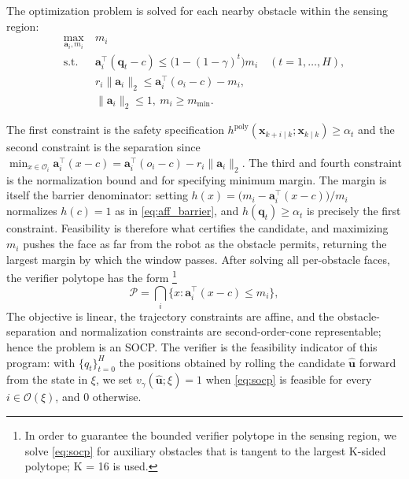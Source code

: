 \documentclass[letterpaper, 10 pt, conference]{ieeeconf}
\newcommand{\q}{\mathbf{q}}
\newcommand{\x}{\mathbf{x}}
\newcommand{\xk}{\mathbf{\x}_{k\mid k}}
\newcommand{\xki}{\mathbf{\x}_{k+i\mid k}}
\newcommand{\ai}{\mathbf{a}_{i}}
\begin{document}
The optimization problem is solved for each nearby obstacle within the sensing region:
\begin{equation}
\begin{aligned}
\max_{\ai, m_i}\ & m_i\\
\text{s.t. }\ & \ai^\top(\mathbf{q}_t-c)\le\big(1-(1-\gamma)^t\big)m_i \quad (t=1,\dots,H),\\
& r_i\|\ai\|_2\le \ai^\top(o_i-c)-m_i,\\
&\|\ai\|_2\le1,\ m_i\ge m_{\min}.
\end{aligned}
\label{eq:socp}
\end{equation}

The first constraint is the safety specification
\(h^{\text{poly}}(\xki;\xk)\geq \alpha_t\) and the second constraint is the separation since
\(\min_{x\in\mathcal O_i}\ai^\top(x-c)
=\ai^\top(o_i-c)-r_i\|\ai\|_2\). The third and fourth constraint is the normalization bound and for specifying minimum margin.
{\color{blue}
The margin is itself the barrier denominator: setting $h(x)=\bigl(m_i-\ai^\top(x-c)\bigr)/m_i$ normalizes $h(c)=1$ as in \eqref{eq:aff_barrier}, and $h(\q_t)\ge\alpha_t$ is precisely the first constraint. Feasibility is therefore what certifies the candidate, and maximizing $m_i$ pushes the face as far from the robot as the obstacle permits, returning the largest margin by which the window passes.
}
After solving all per-obstacle
faces, the verifier polytope has the form \footnote{In order to guarantee the bounded verifier polytope in the sensing region, we solve \eqref{eq:socp} for auxiliary obstacles that is tangent to the largest K-sided polytope; K = 16 is used.}
\[
\mathcal P
=
\bigcap_i
\{x:\ai^\top(x-c)\le m_i\},
\]
The objective is linear, the trajectory constraints are affine, and the obstacle-separation and normalization constraints are second-order-cone representable; hence the problem is an SOCP. {\color{blue} The verifier is the feasibility indicator of this program: with $\{q_t\}_{t=0}^{H}$ the positions obtained by rolling the candidate $\hat{\mathbf u}$ forward from the state in $\xi$, we set $v_\gamma(\hat{\mathbf u};\xi)=1$ when \eqref{eq:socp} is feasible for every $i\in\mathcal O(\xi)$, and $0$ otherwise.}
\end{document}
